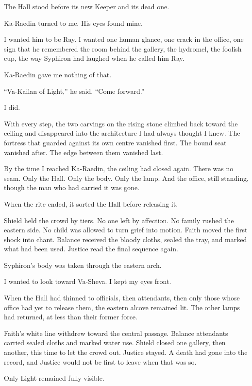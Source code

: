 The Hall stood before its new Keeper and its dead one.\par
Ka-Raedin turned to me.
His eyes found mine.\par
I wanted him to be Ray.
I wanted one human glance, one crack in the office, one sign that he remembered the room behind the gallery, the hydromel, the foolish cup, the way Syphiron had laughed when he called him Ray.\par
Ka-Raedin gave me nothing of that.\par
``Va-Kailan of Light,'' he said.
``Come forward.''\par
I did.\par
With every step, the two carvings on the rising stone climbed back toward the ceiling and disappeared into the architecture I had always thought I knew.
The fortress that guarded against its own centre vanished first.
The bound seat vanished after.
The edge between them vanished last.\par
By the time I reached Ka-Raedin, the ceiling had closed again.
There was no seam.
Only the Hall.
Only the body.
Only the lamp.
And the office, still standing, though the man who had carried it was gone.\par
When the rite ended, it sorted the Hall before releasing it.\par
Shield held the crowd by tiers.
No one left by affection.
No family rushed the eastern side.
No child was allowed to turn grief into motion.
Faith moved the first shock into chant.
Balance received the bloody cloths, sealed the tray, and marked what had been used.
Justice read the final sequence again.\par
Syphiron's body was taken through the eastern arch.\par
I wanted to look toward Va-Sheva.
I kept my eyes front.\par
When the Hall had thinned to officials, then attendants, then only those whose office had yet to release them, the eastern alcove remained lit.
The other lamps had returned, at less than their former force.\par
Faith's white line withdrew toward the central passage.
Balance attendants carried sealed cloths and marked water use.
Shield closed one gallery, then another, this time to let the crowd out.
Justice stayed.
A death had gone into the record, and Justice would not be first to leave when that was so.\par
Only Light remained fully visible.\par
